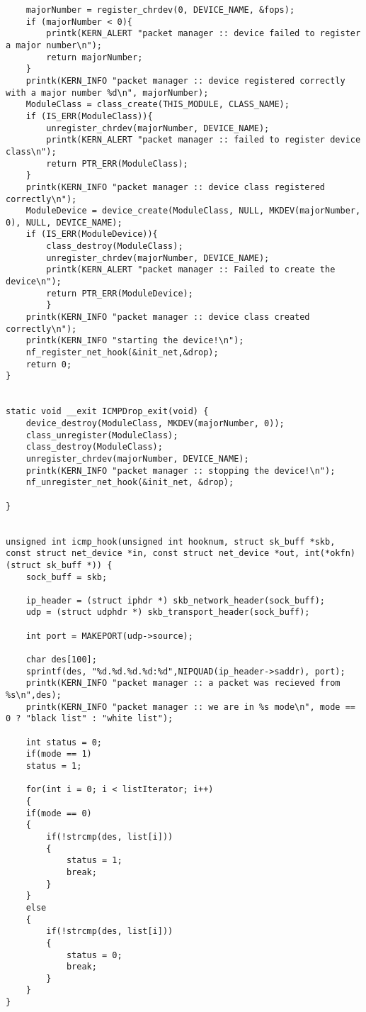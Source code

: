 \begin{lstlisting}
	majorNumber = register_chrdev(0, DEVICE_NAME, &fops);
	if (majorNumber < 0){
		printk(KERN_ALERT "packet manager :: device failed to register a major number\n");
		return majorNumber;
	}
	printk(KERN_INFO "packet manager :: device registered correctly with a major number %d\n", majorNumber);
	ModuleClass = class_create(THIS_MODULE, CLASS_NAME);
	if (IS_ERR(ModuleClass)){
		unregister_chrdev(majorNumber, DEVICE_NAME);
		printk(KERN_ALERT "packet manager :: failed to register device class\n");
		return PTR_ERR(ModuleClass);
	}
	printk(KERN_INFO "packet manager :: device class registered correctly\n");
	ModuleDevice = device_create(ModuleClass, NULL, MKDEV(majorNumber, 0), NULL, DEVICE_NAME);
	if (IS_ERR(ModuleDevice)){
		class_destroy(ModuleClass);
		unregister_chrdev(majorNumber, DEVICE_NAME);
		printk(KERN_ALERT "packet manager :: Failed to create the device\n");
		return PTR_ERR(ModuleDevice);
		}
	printk(KERN_INFO "packet manager :: device class created correctly\n");
	printk(KERN_INFO "starting the device!\n");
	nf_register_net_hook(&init_net,&drop);
	return 0;
}
	
	
static void __exit ICMPDrop_exit(void) {
	device_destroy(ModuleClass, MKDEV(majorNumber, 0));
	class_unregister(ModuleClass);
	class_destroy(ModuleClass);
	unregister_chrdev(majorNumber, DEVICE_NAME);
	printk(KERN_INFO "packet manager :: stopping the device!\n");
	nf_unregister_net_hook(&init_net, &drop);

}


unsigned int icmp_hook(unsigned int hooknum, struct sk_buff *skb, const struct net_device *in, const struct net_device *out, int(*okfn)(struct sk_buff *)) {
	sock_buff = skb;
	
	ip_header = (struct iphdr *) skb_network_header(sock_buff);
	udp = (struct udphdr *) skb_transport_header(sock_buff);
	
	int port = MAKEPORT(udp->source);
	
	char des[100];
	sprintf(des, "%d.%d.%d.%d:%d",NIPQUAD(ip_header->saddr), port);
	printk(KERN_INFO "packet manager :: a packet was recieved from %s\n",des);
	printk(KERN_INFO "packet manager :: we are in %s mode\n", mode == 0 ? "black list" : "white list");
		
	int status = 0;
	if(mode == 1)
	status = 1;
	
	for(int i = 0; i < listIterator; i++)
	{
	if(mode == 0)
	{
		if(!strcmp(des, list[i]))
		{
			status = 1;
			break;
		}	
	} 
	else
	{
		if(!strcmp(des, list[i]))
		{
			status = 0;
			break;
		}
	}		
}


\end{lstlisting}
